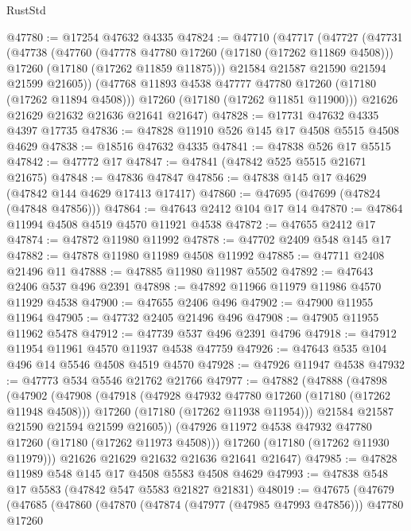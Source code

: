 \begin{lexlean}{RustStd}
\begin{coremodule}
@47780 := @17254 @47632 @4335
@47824 := @47710
    (@47717
      (@47727
        (@47731
          (@47738
            (@47760
              (@47778 @47780 @17260 (@17180 (@17262 @11869 @4508)))
              @17260
              (@17180 (@17262 @11859 @11875)))
            @21584
            @21587
            @21590
            @21594
            @21599
            @21605))
        (@47768 @11893 @4538 @47777 @47780 @17260 (@17180 (@17262 @11894 @4508)))
        @17260
        (@17180 (@17262 @11851 @11900)))
      @21626
      @21629
      @21632
      @21636
      @21641
      @21647)
@47828 := @17731 @47632 @4335 @4397 @17735
@47836 := @47828 @11910 @526 @145 @17 @4508 @5515 @4508 @4629
@47838 := @18516 @47632 @4335
@47841 := @47838 @526 @17 @5515
@47842 := @47772 @17
@47847 := @47841 (@47842 @525 @5515 @21671 @21675)
@47848 := @47836 @47847
@47856 := @47838 @145 @17 @4629 (@47842 @144 @4629 @17413 @17417)
@47860 := @47695 (@47699 (@47824 (@47848 @47856)))
@47864 := @47643 @2412 @104 @17 @14
@47870 := @47864 @11994 @4508 @4519 @4570 @11921 @4538
@47872 := @47655 @2412 @17
@47874 := @47872 @11980 @11992
@47878 := @47702 @2409 @548 @145 @17
@47882 := @47878 @11980 @11989 @4508 @11992
@47885 := @47711 @2408 @21496 @11
@47888 := @47885 @11980 @11987 @5502
@47892 := @47643 @2406 @537 @496 @2391
@47898 := @47892 @11966 @11979 @11986 @4570 @11929 @4538
@47900 := @47655 @2406 @496
@47902 := @47900 @11955 @11964
@47905 := @47732 @2405 @21496 @496
@47908 := @47905 @11955 @11962 @5478
@47912 := @47739 @537 @496 @2391 @4796
@47918 := @47912 @11954 @11961 @4570 @11937 @4538 @47759
@47926 := @47643 @535 @104 @496 @14 @5546 @4508 @4519 @4570
@47928 := @47926 @11947 @4538
@47932 := @47773 @534 @5546 @21762 @21766
@47977 := @47882
    (@47888
      (@47898
        (@47902
          (@47908
            (@47918
              (@47928 @47932 @47780 @17260 (@17180 (@17262 @11948 @4508)))
              @17260
              (@17180 (@17262 @11938 @11954)))
            @21584
            @21587
            @21590
            @21594
            @21599
            @21605))
        (@47926 @11972 @4538 @47932 @47780 @17260 (@17180 (@17262 @11973 @4508)))
        @17260
        (@17180 (@17262 @11930 @11979)))
      @21626
      @21629
      @21632
      @21636
      @21641
      @21647)
@47985 := @47828 @11989 @548 @145 @17 @4508 @5583 @4508 @4629
@47993 := @47838 @548 @17 @5583 (@47842 @547 @5583 @21827 @21831)
@48019 := @47675
    (@47679
      (@47685
        (@47860
          (@47870
            (@47874 (@47977 (@47985 @47993 @47856)))
            @47780
            @17260

\end{coremodule}
\end{lexlean}
